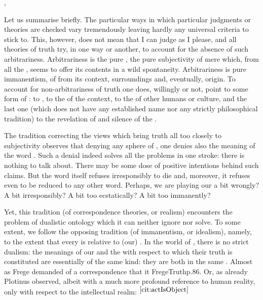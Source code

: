 \sep

\pa\label{pa:immedArbitrary} Let us summarise briefly.
The particular ways in which particular judgments or theories are checked 
vary tremendously leaving hardly any universal criteria to stick to.  This,
however, does not mean that I can judge as I please, and all {theories of truth}
try, in one way or another, to account for the absence of such arbitrariness.
Arbitrariness is the pure , the pure subjectivity of mere  which,  from all the , seems to offer its
contents in a wild spontaneity. Arbitrariness is pure
{immanentism},  of  from its context,
surroundings and, eventually, origin.  To account for non-arbitrariness of
truth one does, willingly or not, point to some form of :
 to ,  to the  of
the context,  to the  of other humans or culture,
and the last one (which does not have any established name nor any strictly
philosophical tradition) to the revelation of  and silence of the
.

The tradition correcting the views which bring truth all too closely to
subjectivity observes that denying any sphere of
, one denies also the meaning of the word . Such a
denial indeed solves all the problems in one stroke: there is nothing to talk
about. There may be some dose of positive intentions behind such claims. But the
word itself refuses irresponsibly to die and, moreover, it refuses even to be
reduced to any other word. Perhaps, we are playing our  a bit
wrongly? A bit irresponsibly? A bit too ecstatically? A bit too {immanently}?

Yet, this tradition (of correspondence theories, or realism) encounters the
problem of dualistic ontology which it can neither ignore nor solve.  To some
extent, we follow the opposing tradition (of immanentism, or idealism), namely,
to the extent that every  is relative to (our) . In
the world of , there is no strict dualism: the {meanings} of
our  and the  with respect to which their truth is
constituted are essentially of the same kind: they are both  in
the same . Almost as Frege demanded of a correspondence that it
\citet{can only be perfect if the corresponding things coincide and are,
  therefore, not distinct things at all.}{FregeTruth}{p.86. Or, as already
  Plotinus observed, albeit with a much more profound reference to human
  reality, only with respect to the intellectual realm: $^{\ref{cit:actIsObject}}$}

